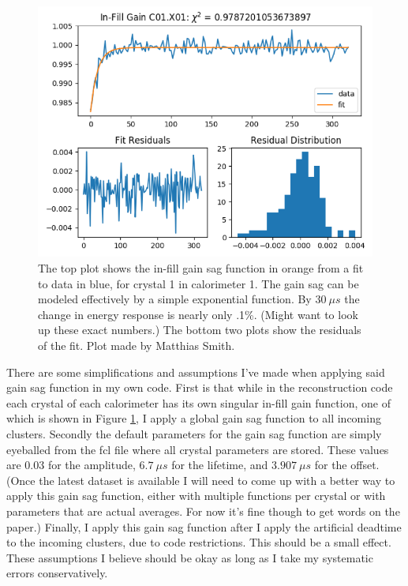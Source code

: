 		\begin{figure}[h]
			\centering
			\includegraphics[width=.8\textwidth]{MatthiasInFill}
		    \caption[MatthiasInFill]{The top plot shows the in-fill gain sag function in orange from a fit to data in blue, for crystal 1 in calorimeter 1. The gain sag can be modeled effectively by a simple exponential function. By $\SI{30}{\mu s}$ the change in energy response is nearly only .1\%. (Might want to look up these exact numbers.) The bottom two plots show the residuals of the fit. Plot made by Matthias Smith.}
		    \label{Fig:MatthiasInFill}
		\end{figure}

		There are some simplifications and assumptions I've made when applying said gain sag function in my own code. First is that while in the reconstruction code each crystal of each calorimeter has its own singular in-fill gain function, one of which is shown in Figure \ref{Fig:MatthiasInFill}, I apply a global gain sag function to all incoming clusters. Secondly the default parameters for the gain sag function are simply eyeballed from the fcl file where all crystal parameters are stored. These values are 0.03 for the amplitude, $\SI{6.7}{\mu s}$ for the lifetime, and $\SI{3.907}{\mu s}$ for the offset. (Once the latest dataset is available I will need to come up with a better way to apply this gain sag function, either with multiple functions per crystal or with parameters that are actual averages. For now it's fine though to get words on the paper.) Finally, I apply this gain sag function after I apply the artificial deadtime to the incoming clusters, due to code restrictions. This should be a small effect. These assumptions I believe should be okay as long as I take my systematic errors conservatively.

